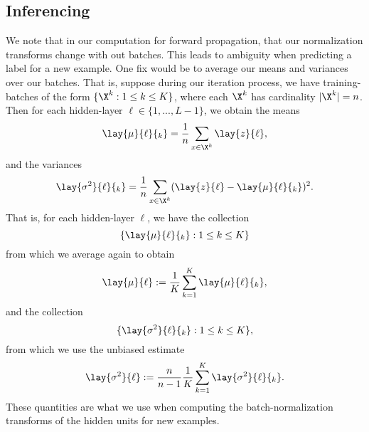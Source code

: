 \subsection{Inferencing}
We note that in our computation for forward propagation, that our normalization transforms change with out batches.  This leads to ambiguity when predicting a label for a new example.  One fix would be to average our means and variances over our batches.  That is, suppose during our iteration process, we have training-batches of the form $\{\X^k:1\leq k\leq K\}$, where each $\X^k$ has cardinality $|\X^k|=n$.  Then for each hidden-layer $\ell\in\{1,...,L-1\}$, we obtain the means
$$\lay{\mu}{\ell}{_k}=\frac{1}{n}\sum_{x\in\X^k}\lay{z}{\ell},$$
and the variances
$$\lay{\sigma^2}{\ell}{_k}=\frac{1}{n}\sum_{x\in\X^k}(\lay{z}{\ell}-\lay{\mu}{\ell}{_k})^2.$$
That is, for each hidden-layer $\ell$, we have the collection
$$\{\lay{\mu}{\ell}{_k}:1\leq k\leq K\}$$
from which we average again to obtain
$$\lay{\mu}{\ell}:=\frac{1}{K}\sum_{k=1}^K\lay{\mu}{\ell}{_k},$$
and the collection
$$\{\lay{\sigma^2}{\ell}{_k}:1\leq k\leq K\},$$
from which we use the unbiased estimate
$$\lay{\sigma^2}{\ell}:=\frac{n}{n-1}\frac{1}{K}\sum_{k=1}^K\lay{\sigma^2}{\ell}{_k}.$$
These quantities are what we use when computing the batch-normalization transforms of the hidden units for new examples.





